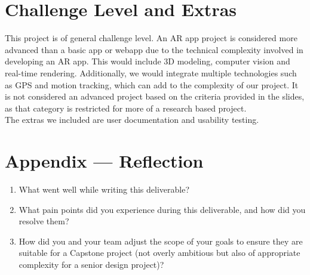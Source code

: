 \documentclass{article}
\begin{document}
\section{Challenge Level and Extras}

This project is of general challenge level. An AR app project is considered more advanced than a basic app or webapp due to the technical complexity involved in developing an AR app. This would include 3D modeling, computer vision and real-time rendering. Additionally, we would integrate multiple technologies such as GPS and motion tracking, which can add to the complexity of our project. It is not considered an advanced project based on the criteria provided in the slides, as that category is restricted for more of a research based project.\\

The extras we included are user documentation and usability testing.\\

\newpage{}

\section*{Appendix --- Reflection}




\begin{enumerate}
    \item What went well while writing this deliverable? 
    \item What pain points did you experience during this deliverable, and how
    did you resolve them?
    \item How did you and your team adjust the scope of your goals to ensure
    they are suitable for a Capstone project (not overly ambitious but also of
    appropriate complexity for a senior design project)?
\end{enumerate}  
\end{document}
